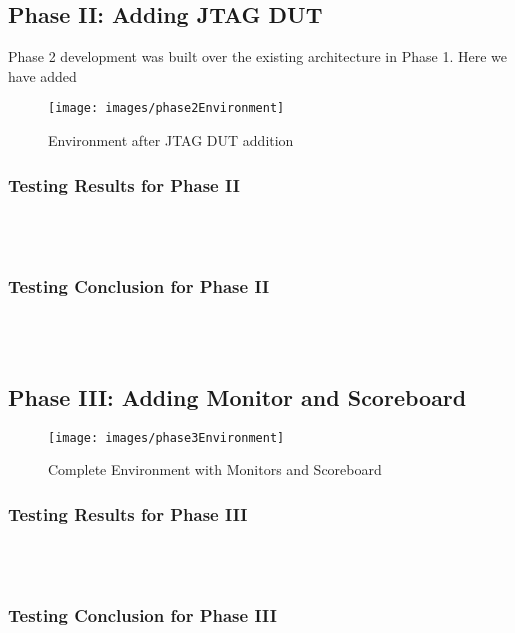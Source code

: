 \documentclass[a4paper,11pt]{article}
\begin{document}
\subsection{Phase II: Adding JTAG DUT}

Phase 2 development was built over the existing architecture in Phase 1. Here we have added 

\begin{figure}[ht]
\centering
\texttt{[image: images/phase2Environment]}
\caption{Environment after JTAG DUT addition}
\end{figure}

\subsubsection{Testing Results for Phase II}
\ \\
\ \\
\subsubsection{Testing Conclusion for Phase II}
\ \\ 
\ \\


\FloatBarrier
\subsection{Phase III: Adding Monitor and Scoreboard}

\begin{figure}[ht]
\centering
\texttt{[image: images/phase3Environment]}
\caption{Complete Environment with Monitors and Scoreboard}
\end{figure}

\subsubsection{Testing Results for Phase III}

\ \\
\ \\
\subsubsection{Testing Conclusion for Phase III}
\ \\ 
\ \\

\newpage
\pagebreak
\end{document}
